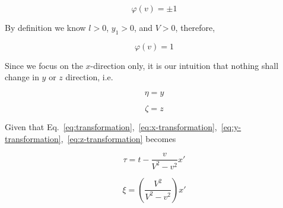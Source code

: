 \begin{equation}
    \varphi(v) = \pm 1
\end{equation}

By definition we know $l > 0$, $y_1 > 0$, and $V > 0$, therefore,

\begin{equation}
    \varphi(v) = 1
\end{equation}

Since we focus on the $x$-direction only, it is our intuition that nothing shall change in $y$ or $z$ direction, i.e.

\begin{equation}
    \eta = y
\end{equation}

\begin{equation}
    \zeta = z
\end{equation}

Given that Eq.~\ref{eq:transformation},~\ref{eq:x-transformation},~\ref{eq:y-transformation},~\ref{eq:z-transformation} becomes

\begin{equation}
    \tau = t - \frac{v}{V^2 - v^2} x'
\end{equation}

\begin{equation}
    \xi = \left( \frac{V^2}{V^2 - v^2} \right) x'
\end{equation}

